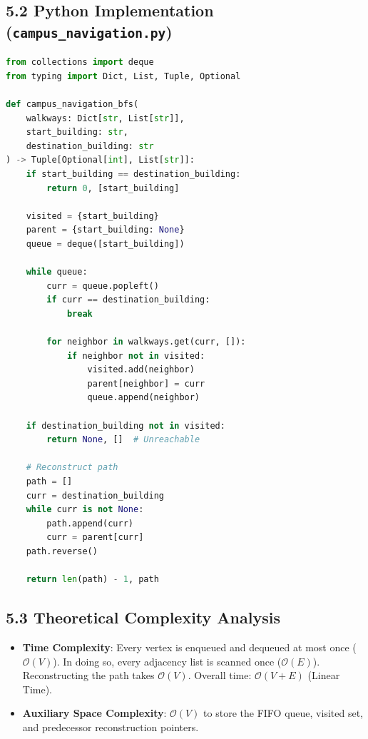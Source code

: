 \documentclass[12pt]{article}
\begin{document}
\subsection*{5.2 Python Implementation (\texttt{campus\_navigation.py})}
\begin{lstlisting}[language=Python]
from collections import deque
from typing import Dict, List, Tuple, Optional

def campus_navigation_bfs(
    walkways: Dict[str, List[str]],
    start_building: str,
    destination_building: str
) -> Tuple[Optional[int], List[str]]:
    if start_building == destination_building:
        return 0, [start_building]

    visited = {start_building}
    parent = {start_building: None}
    queue = deque([start_building])

    while queue:
        curr = queue.popleft()
        if curr == destination_building:
            break

        for neighbor in walkways.get(curr, []):
            if neighbor not in visited:
                visited.add(neighbor)
                parent[neighbor] = curr
                queue.append(neighbor)

    if destination_building not in visited:
        return None, []  # Unreachable

    # Reconstruct path
    path = []
    curr = destination_building
    while curr is not None:
        path.append(curr)
        curr = parent[curr]
    path.reverse()

    return len(path) - 1, path
\end{lstlisting}

\subsection*{5.3 Theoretical Complexity Analysis}
\begin{itemize}
    \item \textbf{Time Complexity}: Every vertex is enqueued and dequeued at most once ($\mathcal{O}(V)$). In doing so, every adjacency list is scanned once ($\mathcal{O}(E)$). Reconstructing the path takes $\mathcal{O}(V)$. Overall time: $\mathcal{O}(V + E)$ (Linear Time).
    \item \textbf{Auxiliary Space Complexity}: $\mathcal{O}(V)$ to store the FIFO queue, visited set, and predecessor reconstruction pointers.
\end{itemize}
\end{document}
